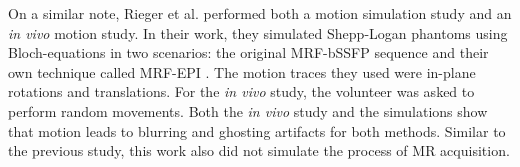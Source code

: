 \hfill

On a similar note, Rieger et al. \cite{Rieger2017} performed both a motion simulation study and an \textit{in vivo} motion study.
In their work, they simulated Shepp-Logan phantoms using Bloch-equations in two scenarios: the original MRF-bSSFP sequence \cite{Ma2013} and their own technique called MRF-EPI \cite{Rieger2016}. 
The motion traces they used were in-plane rotations and translations.
For the \textit{in vivo} study, the volunteer was asked to perform random movements.
Both the \textit{in vivo} study and the simulations show that motion leads to blurring and ghosting artifacts for both methods.
Similar to the previous study, this work also did not simulate the process of MR acquisition.

